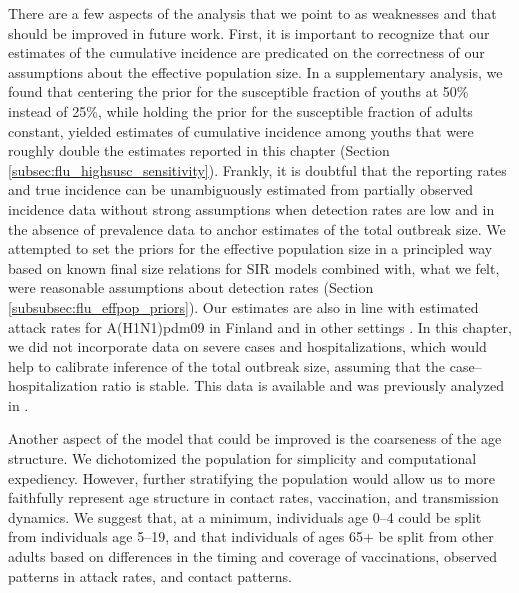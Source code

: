 There are a few aspects of the analysis that we point to as weaknesses and that should be improved in future work. First, it is important to recognize that our estimates of the cumulative incidence are predicated on the correctness of our assumptions about the effective population size. In a supplementary analysis, we found that centering the prior for the susceptible fraction of youths at 50\% instead of 25\%, while holding the prior for the susceptible fraction of adults constant, yielded estimates of cumulative incidence among youths that were roughly double the estimates reported in this chapter (Section \ref{subsec:flu_highsusc_sensitivity}). Frankly, it is doubtful that the reporting rates and true incidence can be unambiguously estimated from partially observed incidence data without strong assumptions when detection rates are low and in the absence of prevalence data to anchor estimates of the total outbreak size. We attempted to set the priors for the effective population size in a principled way based on known final size relations for SIR models combined with, what we felt, were reasonable assumptions about detection rates (Section \ref{subsubsec:flu_effpop_priors}). Our estimates are also in line with estimated attack rates for A(H1N1)pdm09 in Finland \cite{cuesta2016pandemic,shubin2014estimating,shubin2014estimating} and in other settings \cite{dawood2012estimated,opatowski2011transmission,steens2011age}. In this chapter, we did not incorporate data on severe cases and hospitalizations, which would help to calibrate inference of the total outbreak size, assuming that the case--hospitalization ratio is stable. This data is available and was previously analyzed in \cite{shubin2016revealing}. 
 
Another aspect of the model that could be improved is the coarseness of the age structure. We dichotomized the population for simplicity and computational expediency. However, further stratifying the population would allow us to more faithfully represent age structure in contact rates, vaccination, and transmission dynamics. We suggest that, at a minimum, individuals age 0--4 could be split from individuals age 5--19, and that individuals of ages 65+ be split from other adults based on differences in the timing and coverage of vaccinations, observed patterns in attack rates, and contact patterns. 